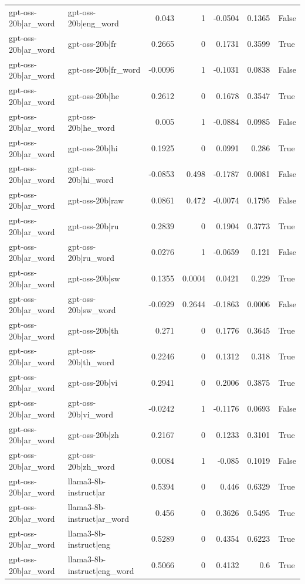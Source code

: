 \begin{table}
\begin{tabular}{l l r r r r l}
gpt-oss-20b|ar_word & gpt-oss-20b|eng_word & 0.043 & 1 & -0.0504 & 0.1365 & False \\
gpt-oss-20b|ar_word & gpt-oss-20b|fr & 0.2665 & 0 & 0.1731 & 0.3599 & True \\
gpt-oss-20b|ar_word & gpt-oss-20b|fr_word & -0.0096 & 1 & -0.1031 & 0.0838 & False \\
gpt-oss-20b|ar_word & gpt-oss-20b|he & 0.2612 & 0 & 0.1678 & 0.3547 & True \\
gpt-oss-20b|ar_word & gpt-oss-20b|he_word & 0.005 & 1 & -0.0884 & 0.0985 & False \\
gpt-oss-20b|ar_word & gpt-oss-20b|hi & 0.1925 & 0 & 0.0991 & 0.286 & True \\
gpt-oss-20b|ar_word & gpt-oss-20b|hi_word & -0.0853 & 0.498 & -0.1787 & 0.0081 & False \\
gpt-oss-20b|ar_word & gpt-oss-20b|raw & 0.0861 & 0.472 & -0.0074 & 0.1795 & False \\
gpt-oss-20b|ar_word & gpt-oss-20b|ru & 0.2839 & 0 & 0.1904 & 0.3773 & True \\
gpt-oss-20b|ar_word & gpt-oss-20b|ru_word & 0.0276 & 1 & -0.0659 & 0.121 & False \\
gpt-oss-20b|ar_word & gpt-oss-20b|sw & 0.1355 & 0.0004 & 0.0421 & 0.229 & True \\
gpt-oss-20b|ar_word & gpt-oss-20b|sw_word & -0.0929 & 0.2644 & -0.1863 & 0.0006 & False \\
gpt-oss-20b|ar_word & gpt-oss-20b|th & 0.271 & 0 & 0.1776 & 0.3645 & True \\
gpt-oss-20b|ar_word & gpt-oss-20b|th_word & 0.2246 & 0 & 0.1312 & 0.318 & True \\
gpt-oss-20b|ar_word & gpt-oss-20b|vi & 0.2941 & 0 & 0.2006 & 0.3875 & True \\
gpt-oss-20b|ar_word & gpt-oss-20b|vi_word & -0.0242 & 1 & -0.1176 & 0.0693 & False \\
gpt-oss-20b|ar_word & gpt-oss-20b|zh & 0.2167 & 0 & 0.1233 & 0.3101 & True \\
gpt-oss-20b|ar_word & gpt-oss-20b|zh_word & 0.0084 & 1 & -0.085 & 0.1019 & False \\
gpt-oss-20b|ar_word & llama3-8b-instruct|ar & 0.5394 & 0 & 0.446 & 0.6329 & True \\
gpt-oss-20b|ar_word & llama3-8b-instruct|ar_word & 0.456 & 0 & 0.3626 & 0.5495 & True \\
gpt-oss-20b|ar_word & llama3-8b-instruct|eng & 0.5289 & 0 & 0.4354 & 0.6223 & True \\
gpt-oss-20b|ar_word & llama3-8b-instruct|eng_word & 0.5066 & 0 & 0.4132 & 0.6 & True \\

\end{tabular}
\end{table}
